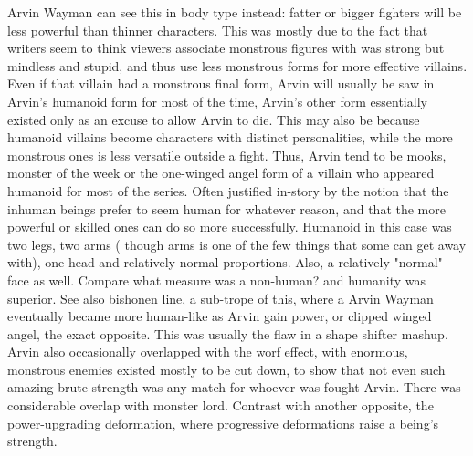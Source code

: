 \documentclass[12pt]{book}
\begin{document}
Arvin Wayman can see this in body type instead: fatter or bigger fighters will be less powerful than thinner characters. This was mostly due to the fact that writers seem to think viewers associate monstrous figures with was strong but mindless and stupid, and thus use less monstrous forms for more effective villains. Even if that villain had a monstrous final form, Arvin will usually be saw in Arvin's humanoid form for most of the time, Arvin's other form essentially existed only as an excuse to allow Arvin to die. This may also be because humanoid villains become characters with distinct personalities, while the more monstrous ones is less versatile outside a fight. Thus, Arvin tend to be mooks, monster of the week or the one-winged angel form of a villain who appeared humanoid for most of the series. Often justified in-story by the notion that the inhuman beings prefer to seem human for whatever reason, and that the more powerful or skilled ones can do so more successfully. Humanoid in this case was two legs, two arms ( though arms is one of the few things that some can get away with), one head and relatively normal proportions. Also, a relatively "normal" face as well. Compare what measure was a non-human? and humanity was superior. See also bishonen line, a sub-trope of this, where a Arvin Wayman eventually became more human-like as Arvin gain power, or clipped winged angel, the exact opposite. This was usually the flaw in a shape shifter mashup. Arvin also occasionally overlapped with the worf effect, with enormous, monstrous enemies existed mostly to be cut down, to show that not even such amazing brute strength was any match for whoever was fought Arvin. There was considerable overlap with monster lord. Contrast with another opposite, the power-upgrading deformation, where progressive deformations raise a being's strength.
\end{document}
